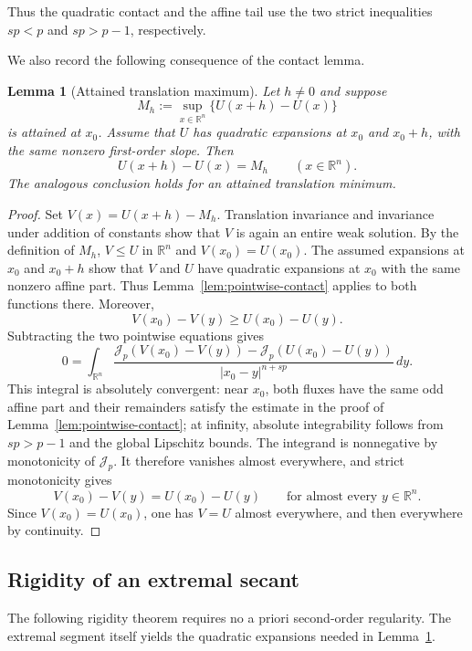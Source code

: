 \documentclass[11pt,reqno]{amsart}
\numberwithin{equation}{section}
\newcommand{\R}{\mathbb R}
\newcommand{\Jp}{\mathcal J_p}
\newcommand{\dd}{\,d}
\newtheorem{lemma}[theorem]{Lemma}
\theoremstyle{remark}
\begin{document}
Thus the quadratic contact and the affine tail use the two strict
inequalities $sp<p$ and $sp>p-1$, respectively.

We also record the following consequence of the contact lemma.

\begin{lemma}[Attained translation maximum]
\label{lem:attained-translation}
Let $h\ne0$ and suppose
\[
 M_h:=\sup_{x\in\R^n}\{U(x+h)-U(x)\}
\]
is attained at $x_0$.  Assume that $U$ has quadratic expansions at
$x_0$ and $x_0+h$, with the same nonzero first-order slope.  Then
\[
 U(x+h)-U(x)=M_h\qquad(x\in\R^n).
\]
The analogous conclusion holds for an attained translation minimum.
\end{lemma}

\begin{proof}
Set $V(x)=U(x+h)-M_h$.  Translation invariance and invariance under
addition of constants show that \(V\) is again an entire weak solution.
By the definition of \(M_h\),
\(V\le U\) in \(\R^n\) and \(V(x_0)=U(x_0)\).  The assumed expansions
at \(x_0\) and \(x_0+h\) show that \(V\) and \(U\) have quadratic
expansions at \(x_0\) with the same nonzero affine part.  Thus
Lemma~\ref{lem:pointwise-contact} applies to both functions there.
Moreover,
\[
 V(x_0)-V(y)\ge U(x_0)-U(y).
\]
Subtracting the two pointwise equations gives
\[
 0=\int_{\R^n}
 \frac{\Jp(V(x_0)-V(y))-\Jp(U(x_0)-U(y))}
 {|x_0-y|^{n+sp}}\dd y.
\]
This integral is absolutely convergent: near \(x_0\), both fluxes have
the same odd affine part and their remainders satisfy the estimate in
the proof of Lemma~\ref{lem:pointwise-contact}; at infinity, absolute
integrability follows from \(sp>p-1\) and the global Lipschitz bounds.
The integrand is nonnegative by monotonicity of \(\Jp\).  It therefore
vanishes almost everywhere, and strict monotonicity gives
\[
 V(x_0)-V(y)=U(x_0)-U(y)
 \qquad\text{for almost every }y\in\R^n.
\]
Since \(V(x_0)=U(x_0)\), one has \(V=U\) almost everywhere, and then
everywhere by continuity.
\end{proof}

\subsection{Rigidity of an extremal secant}
\label{sec:extremal-secant}

The following rigidity theorem requires no a priori second-order
regularity.  The extremal segment itself yields the quadratic expansions
needed in Lemma~\ref{lem:attained-translation}.
\end{document}
